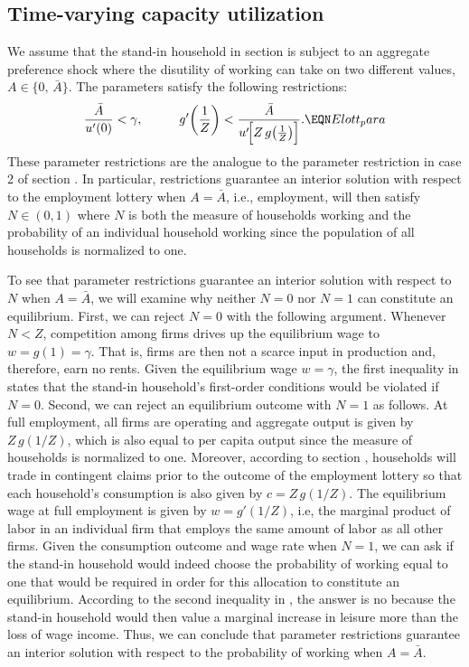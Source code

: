 \subsection{Time-varying capacity utilization}
%
We assume that the stand-in household in section 
is subject to an aggregate preference shock where the disutility of
working can take on two different values, $A\in\{0,\, \bar A\}$.
The parameters satisfy the following restrictions:
$$
{\bar A \over u'(0)} < \gamma, \hskip1cm
g'\!\left({ 1 \over Z}\right) <
 {\bar A \over u'\!\Bigl[Z\,g\!\left({1 \over Z}\right)\Bigr] }. \EQN Elott_para
$$
These parameter restrictions are the analogue to
the parameter restriction in case 2 of section .
In particular, restrictions 
guarantee an interior solution with
respect to the employment lottery when $A=\bar A$, i.e., employment,
will then satisfy $N\in(0,1)$ where $N$ is both the measure of
households working and the probability of an individual household working
since the population of all households is normalized to one.

To see that parameter restrictions  guarantee an
interior solution with respect to $N$ when $A=\bar A$, we will examine
why neither $N=0$ nor $N=1$ can constitute an equilibrium. First,
we can reject $N=0$ with the following argument. Whenever $N<Z$,
competition among firms drives up the equilibrium
wage to $w=g(1)=\gamma$. That is, firms are then not
a scarce input in production and, therefore, earn no rents. Given
the equilibrium wage $w=\gamma$, the first inequality in
 states that the stand-in household's
first-order conditions  would be
violated if $N=0$. Second, we can reject an equilibrium
outcome with $N=1$ as follows. At full employment, all
firms are operating and aggregate output is given by
$Z\,g(1/Z)$, which is also equal to per capita output since the
measure of households is normalized to one. Moreover,
according to section , households will
trade in contingent claims prior to the outcome of the employment
lottery so that each household's consumption is also given
by $c=Z\,g(1/Z)$. The equilibrium wage at full employment is
given by $w=g'(1/Z)$, i.e, the marginal product of labor in an
individual firm that employs the same amount of labor
as all other firms. Given the  consumption outcome and
wage rate when $N=1$, we can ask if the stand-in household
would indeed choose the probability of working equal to one
that would be required in order for this allocation to constitute
an equilibrium. According to the second inequality in
, the answer is no because the stand-in household
would then value a marginal increase in leisure more than the
loss of wage income. Thus, we can conclude that parameter
restrictions  guarantee an interior solution
with respect to the probability of working when $A=\bar A$.

